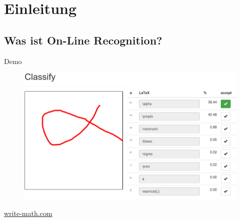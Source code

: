 \section{Einleitung}
\subsection{Was ist On-Line Recognition?}

\begin{frame}{Demo}
    \begin{figure}[h]
        \centering
        \includegraphics*[width=0.7\linewidth, keepaspectratio]{images/Classification.png}
    \end{figure}

    \href{http://write-math.com}{write-math.com}
\end{frame}


